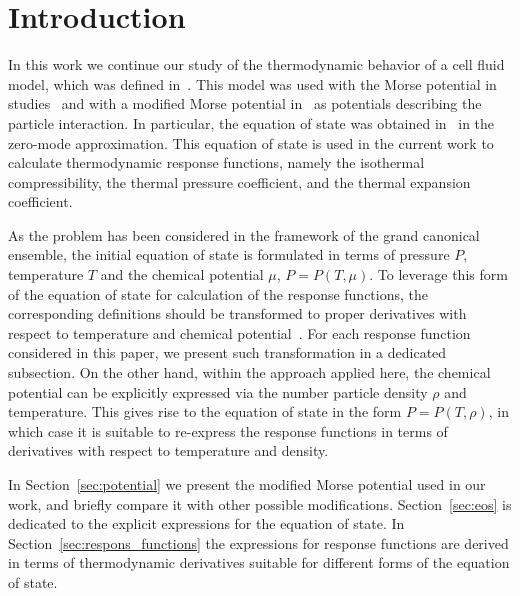 \section{Introduction}
In this work we continue our study of the thermodynamic behavior of a cell fluid model, which was defined in~\cite{KozitskyKozlovskiiDobush2018book,KozitskyKozlovskiiDobush2020}. This model was used with the Morse potential in studies~\cite{KozlovskiiDobush2020,PylyukDobush2020} and with a modified Morse potential in~\cite{PylyukEtAlJML2023,PylyukKozlovskiiDobushUJP2023b} as potentials describing the particle interaction. In particular, the equation of state was obtained in~\cite{KozlovskiiDobush2020} in the zero-mode approximation. This equation of state is used in the current work to calculate thermodynamic response functions, namely the isothermal compressibility, the thermal pressure coefficient, and the thermal expansion coefficient. 

As the problem has been considered in the framework of the grand canonical ensemble, the initial equation of state is formulated in terms of pressure $P$, temperature $T$ and the chemical potential $\mu$, $P = P(T,\mu)$. To leverage this form of the equation of state for calculation of the response functions, the corresponding definitions should be transformed to proper derivatives with respect to temperature and chemical potential~\cite{StrokerMeier2021}. For each response function considered in this paper, we present such transformation in a dedicated subsection. On the other hand, within the approach applied here, the chemical potential can be explicitly expressed via the number particle density $\rho$ and temperature. This gives rise to the equation of state in the form $P = P(T, \rho)$, in which case it is suitable to re-express the response functions in terms of derivatives with respect to temperature and density.

In Section~\ref{sec:potential} we present the modified Morse potential used in our work, and briefly compare it with other possible modifications. Section~\ref{sec:eos} is dedicated to the explicit expressions for the equation of state. In Section~\ref{sec:respons_functions} the expressions for response functions are derived in terms of thermodynamic derivatives suitable for different forms of the equation of state.


